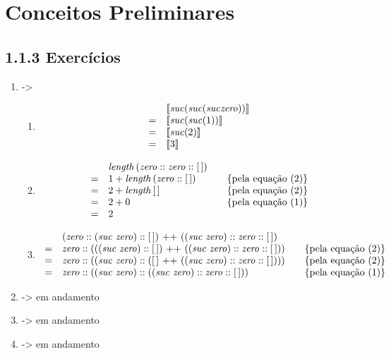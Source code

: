 \section{Conceitos Preliminares}

\subsection{1.1.3 Exerc\'icios}

	\begin{enumerate}
	  \item ->
	  
	  \begin{enumerate}
	    \item 
	    \[ 
	    \begin{array}{ll}  
	    & \llbracket \textit{suc\/} (\textit{suc\/} (\textit{suc\/} \textit{zero\/})) \rrbracket\\
	    = & \llbracket \textit{suc\/} (\textit{suc\/} (1)) \rrbracket \\
	    = & \llbracket \textit{suc\/} (2) \rrbracket \\
	    = & \llbracket 3 \rrbracket \\ 
	    \end{array}
	    \]
	    
	    \item
	    \[
	    \begin{array}{llcl}
	    & \length\,(\zero ::\zero :: [\,])& & \\
	    = &1 + \length \,(\zero :: [\,]) & & \{\text{pela equa\c{c}\~ao }(2)\}\\
	    = &2 + \length \,[\,] & & \{\text{pela equa\c{c}\~ao }(2)\}\\
	    = &2 + 0 & & \{\text{pela equa\c{c}\~ao }(1)\}\\
	    = &2
	    \end{array}
	    \]
	    
	    \item
	    \[
	    \begin{array}{llcl}    
	    & (\zero :: (\suc\,\,\zero) :: [\,]) \text{ ++ } ((\suc\,\,\zero) :: \zero :: [\,]) & & \\
	    = & \zero :: (((\suc\,\,\zero) :: [\,]) \text{ ++ } ((\suc\,\,\zero) :: \zero::[\,])) & & \{\text{pela equa\c{c}\~ao }(2)\}\\
	    = & \zero :: ((\suc\,\,\zero) :: ( [\,] \text{ ++ } ((\suc\,\,\zero) :: \zero::[\,]))) & & \{\text{pela equa\c{c}\~ao }(2)\}\\
	    = & \zero :: ((\suc\,\,\zero) :: ((\suc\,\,\zero) :: \zero::[\,])) & & \{\text{pela equa\c{c}\~ao }(1)\}\\
	    \end{array}
	    \]
	  \end{enumerate}
	  
	  \item -> em andamento
	  \item -> em andamento
	  \item -> em andamento
	 
	\end{enumerate}


